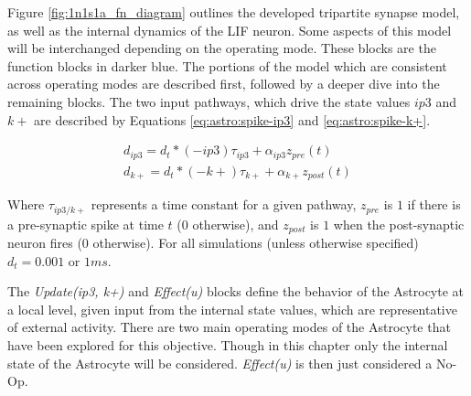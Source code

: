 
Figure \ref{fig:1n1s1a_fn_diagram} outlines the developed tripartite synapse
model, as well as the internal dynamics of the LIF neuron. Some aspects of
this model will be interchanged depending on the operating mode. These
blocks are the function blocks in darker blue. The portions of the model
which are consistent across operating modes are described first, followed by
a deeper dive into the remaining blocks. The two input pathways, which drive
the state values $ip3$ and $k+$ are described by Equations
\ref{eq:astro:spike-ip3} and \ref{eq:astro:spike-k+}.

\begin{align}
  d_{ip3} = d_t * (-ip3)\tau_{ip3} + \alpha_{ip3} z_{pre}(t) \label{eq:astro:spike-ip3} \\
  d_{k+} = d_t * (-k+)\tau_{k+} + \alpha_{k+} z_{post}(t) \label{eq:astro:spike-k+}
\end{align}

Where $\tau_{ip3/k+}$ represents a time constant for a given pathway, $z_{pre}$
is $1$ if there is a pre-synaptic spike at time $t$ ($0$ otherwise), and
$z_{post}$ is $1$ when the post-synaptic neuron fires ($0$ otherwise). For all
simulations (unless otherwise specified) $d_t = 0.001$ or $1ms$.

The \emph{Update(ip3, k+)} and \emph{Effect(u)} blocks define the behavior
of the Astrocyte at a local level, given input from the internal state
values, which are representative of external activity. There are two main
operating modes of the Astrocyte that have been explored for this
objective. Though in this chapter only the internal state of the Astrocyte will
be considered. \emph{Effect(u)} is then just considered a No-Op.



    
